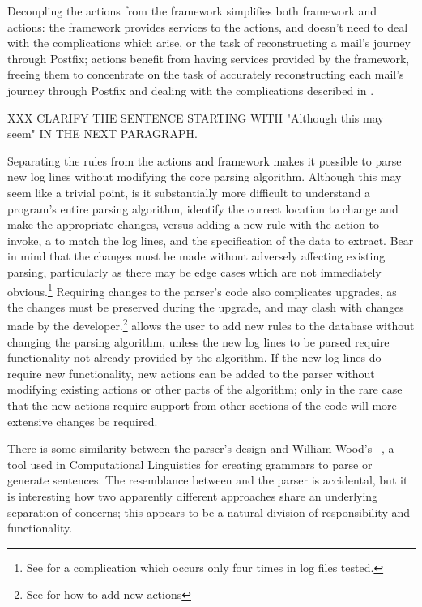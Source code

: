 Decoupling the actions from the framework simplifies both framework and
actions: the framework provides services to the actions, and doesn't need
to deal with the complications which arise, or the task of reconstructing a
mail's journey through Postfix; actions benefit from having services
provided by the framework, freeing them to concentrate on the task of
accurately reconstructing each mail's journey through Postfix and dealing
with the complications described in .

XXX CLARIFY THE SENTENCE STARTING WITH "Although this may seem" IN THE NEXT
PARAGRAPH\@.

Separating the rules from the actions and framework makes it possible to
parse new log lines without modifying the core parsing algorithm.  Although
this may seem like a trivial point, is it substantially more difficult to
understand a program's entire parsing algorithm, identify the correct
location to change and make the appropriate changes, versus adding a new
rule with the action to invoke, a \regex{} to match the log lines, and the
specification of the data to extract.  Bear in mind that the changes must
be made without adversely affecting existing parsing, particularly as there
may be edge cases which are not immediately obvious.\footnote{See
 for a complication which
occurs only four times in \numberOFlogFILES{} log files tested.}  Requiring
changes to the parser's code also complicates upgrades, as the changes
must be preserved during the upgrade, and may clash with changes made by
the developer.\footnote{See  for how to add
new actions}  \parsername{} allows the user to add new rules to the
database without changing the parsing algorithm, unless the new log lines
to be parsed require functionality not already provided by the algorithm.
If the new log lines do require new functionality, new actions can be added
to the parser without modifying existing actions or other parts of the
algorithm; only in the rare case that the new actions require support from
other sections of the code will more extensive changes be required.

There is some similarity between the parser's design and William Wood's
\ATN{}~\cite{atns, nlpip}, a tool used in Computational Linguistics for
creating grammars to parse or generate sentences.  The resemblance between
\ATN{} and the parser is accidental, but it is interesting how two
apparently different approaches share an underlying separation of concerns;
this appears to be a natural division of responsibility and functionality.


